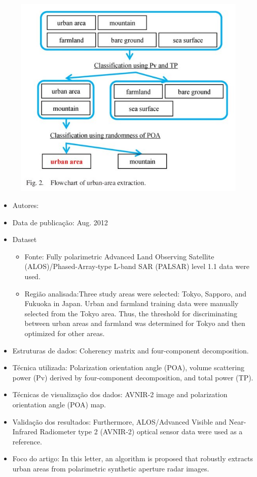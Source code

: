 \documentclass[paper=a4, fontsize=11pt]{scrartcl}
\begin{document}
\begin{figure}[hbt]
	\centering
	\includegraphics[width=0.4\linewidth]{Figures/urban-areaExtraction.jpg}
	\label{Fig:urbanareaExtraction}
\end{figure}

\begin{itemize}
    \item Autores:~\cite{kajimoto2012urban}
    \item Data de publicação: Aug. 2012
    \item Dataset
    \begin{itemize}
        \item Fonte: Fully polarimetric Advanced Land Observing Satellite (ALOS)/Phased-Array-type L-band SAR (PALSAR) level 1.1 data were used. 
        \item Região analisada:Three study areas were selected: Tokyo, Sapporo, and Fukuoka in Japan. Urban and farmland training data were manually selected from the Tokyo area. Thus, the threshold for discriminating between urban areas and farmland was determined for Tokyo and then optimized for other areas.
    \end{itemize}
    \item Estruturas de dados: Coherency matrix and four-component decomposition.
    \item Técnica utilizada: Polarization orientation angle (POA), volume scattering power (Pv) derived by four-component decomposition, and total power (TP).
    \item Técnicas de visualização dos dados: AVNIR-2 image and polarization orientation angle (POA) map.
    \item Validação dos resultados: Furthermore, ALOS/Advanced Visible and Near-Infrared Radiometer type 2 (AVNIR-2) optical sensor data were used as a reference.
    \item Foco do artigo: In this letter, an algorithm is proposed that robustly extracts urban areas from polarimetric synthetic aperture radar images.
\end{itemize}
\end{document}
